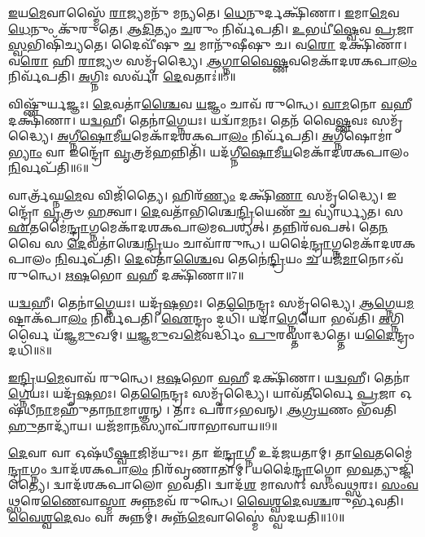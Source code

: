 \-\ul{𑌇}\-𑌯\-\ul{𑌮𑍇}\-𑌵𑌾𑌸𑍍𑌮𑍈᳴ \ul{𑌰𑌾}\-𑌜𑍍𑌯𑌮𑌨𑍁᳴ 𑌮𑌨𑍍𑌯𑌤𑍇।
\-\ul{𑌧𑍇}\-𑌨𑍁𑌰𑍍𑌦𑌕𑍍𑌷𑌿᳴𑌣𑌾।
\-\ul{𑌇}\-𑌮𑌾\-\ul{𑌮𑍇}\-𑌵 \ul{𑌧𑍇}\-𑌨𑍁𑌂 𑌕𑍁᳴𑌰𑍁𑌤𑍇।
\-\ul{𑌆}\-\-\ul{𑌦𑌿}\-𑌤𑍍𑌯𑌂 \ul{𑌚}\-𑌰𑍁𑌂 𑌨𑌿𑌰𑍍𑌵᳴𑌪𑌤𑌿।
\-\ul{𑌉}\-𑌭𑌯𑍀॑\-\ul{𑌷𑍍𑌵𑍇}\-𑌵 \ul{𑌪𑍍𑌰}\-𑌜𑌾\-\ul{𑌸𑍍𑌵}\-𑌭𑌿𑌷𑌿᳴𑌚𑍍𑌯𑌤𑍇।
𑌦𑍈𑌵𑍀᳴𑌷𑍁 \ul{𑌚} 𑌮𑌾𑌨𑍁᳴𑌷𑍀𑌷𑍁 𑌚।
𑌵\-\ul{𑌰𑍋} 𑌦𑌕𑍍𑌷𑌿᳴𑌣𑌾।
𑌵\-\ul{𑌰𑍋} 𑌹𑌿 \ul{𑌰𑌾}\-𑌜𑍍𑌯𑍞 𑌸𑌮𑍃᳴𑌦𑍍𑌧𑍍𑌯𑍈।
\-\ul{𑌆}\-\-\ul{𑌗𑍍𑌨𑌾}\-\-\ul{𑌵𑍈}\-\-\ul{𑌷𑍍𑌣}\-𑌵𑌮𑍇𑌕𑌾᳴\-𑌦𑌶\-𑌕𑌪𑌾\-\ul{𑌲𑌂} 𑌨𑌿𑌰𑍍𑌵᳴𑌪𑌤𑌿।
\-\ul{𑌅}\-𑌗𑍍𑌨𑌿𑌃 𑌸𑌰𑍍𑌵𑌾᳴ \ul{𑌦𑍇}\-𑌵𑌤𑌾𑌃॑॥5॥

𑌵𑌿𑌷𑍍𑌣𑍁᳴𑌰𑍍\mbox{}\-\ul{𑌯}\-𑌜𑍍𑌞𑌃।
\-\ul{𑌦𑍇}\-𑌵𑌤𑌾॑\-\ul{𑌶𑍍𑌚𑍈}\-𑌵 \ul{𑌯}\-𑌜𑍍𑌞𑌂 𑌚𑌾𑌵᳴ 𑌰𑍁𑌨𑍍𑌧𑍇।
\-\ul{𑌵𑌾}\-\-\ul{𑌮}\-𑌨𑍋 \ul{𑌵}\-𑌹𑍀 𑌦𑌕𑍍𑌷𑌿᳴𑌣𑌾।
𑌯\-\ul{𑌦𑍍𑌵}\-𑌹𑍀।
𑌤𑍇𑌨𑌾॑\-\ul{𑌗𑍍𑌨𑍇}\-𑌯𑌃।
𑌯𑌦𑍍𑌵𑌾᳴\-\ul{𑌮}\-𑌨𑌃।
𑌤𑍇𑌨᳴ 𑌵𑍈\-\ul{𑌷𑍍𑌣}\-𑌵𑌃 𑌸𑌮𑍃᳴𑌦𑍍𑌧𑍍𑌯𑍈।
\-\ul{𑌅}\-\-\ul{𑌗𑍍𑌨𑍀}\-\-\ul{𑌷𑍋}\-𑌮𑍀\-\ul{𑌯}\-𑌮𑍇𑌕𑌾᳴\-𑌦𑌶\-𑌕𑌪𑌾\-\ul{𑌲𑌂} 𑌨𑌿𑌰𑍍𑌵᳴𑌪𑌤𑌿।
\-\ul{𑌅}\-𑌗𑍍𑌨𑍀𑌷𑍋𑌮𑌾॑\-\ul{𑌭𑍍𑌯𑌾𑌂} 𑌵𑌾 𑌇𑌨𑍍𑌦𑍍𑌰𑍋᳴ \ul{𑌵𑍃}\-𑌤𑍍𑌰𑌮᳴\-\ul{𑌹}\-𑌨𑍍𑌨𑌿𑌤𑌿᳴।
𑌯𑌦᳴𑌗𑍍𑌨𑍀\-\ul{𑌷𑍋}\-𑌮𑍀\-\ul{𑌯}\-𑌮𑍇𑌕𑌾᳴\-𑌦𑌶\-𑌕𑌪𑌾𑌲𑌂 \ul{𑌨𑌿}\-𑌰𑍍𑌵𑌪᳴𑌤𑌿॥6॥

𑌵𑌾𑌰𑍍𑌤𑍍𑌰᳴𑌘𑍍𑌨\-\ul{𑌮𑍇}\-𑌵 𑌵𑌿𑌜𑌿᳴𑌤𑍍𑌯𑍈।
𑌹𑌿𑌰᳴\-\ul{𑌣𑍍𑌯𑌂} 𑌦𑌕𑍍𑌷𑌿᳴\-\ul{𑌣𑌾} 𑌸𑌮𑍃᳴𑌦𑍍𑌧𑍍𑌯𑍈।
𑌇𑌨𑍍𑌦𑍍𑌰𑍋᳴ \ul{𑌵𑍃}\-𑌤𑍍𑌰𑍞 \ul{𑌹}\-𑌤𑍍𑌵𑌾।
\-\ul{𑌦𑍇}\-𑌵𑌤𑌾᳴𑌭𑌿𑌶𑍍𑌚𑍇\-\ul{𑌨𑍍𑌦𑍍𑌰𑌿}\-𑌯𑍇𑌣᳴ \ul{𑌚} 𑌵𑍍𑌯𑌾॑𑌰𑍍𑌧𑍍𑌯𑌤।
𑌸 \ul{𑌏}\-𑌤𑌮𑍈॑\-\ul{𑌨𑍍𑌦𑍍𑌰𑌾}\-𑌗𑍍𑌨𑌮𑍇𑌕𑌾᳴\-𑌦𑌶\-𑌕𑌪𑌾𑌲𑌮𑌪𑌶𑍍𑌯𑌤𑍍।
𑌤𑌨𑍍𑌨𑌿𑌰᳴𑌵𑌪𑌤𑍍।
𑌤𑍇\-\ul{𑌨} 𑌵𑍈 𑌸 \ul{𑌦𑍇}\-𑌵𑌤𑌾॑𑌶𑍍𑌚𑍇\-\ul{𑌨𑍍𑌦𑍍𑌰𑌿}\-𑌯𑌂 𑌚𑌾𑌵𑌾᳴𑌰𑍁𑌨𑍍𑌧।
𑌯𑌦𑍈॑\-\ul{𑌨𑍍𑌦𑍍𑌰𑌾}\-𑌗𑍍𑌨𑌮𑍇𑌕𑌾᳴\-𑌦𑌶\-𑌕𑌪𑌾𑌲𑌂 \ul{𑌨𑌿}\-𑌰𑍍𑌵𑌪᳴𑌤𑌿।
\-\ul{𑌦𑍇}\-𑌵𑌤𑌾॑\-\ul{𑌶𑍍𑌚𑍈}\-𑌵 𑌤𑍇𑌨𑍇॑\-\ul{𑌨𑍍𑌦𑍍𑌰𑌿}\-𑌯𑌂 \ul{𑌚} 𑌯𑌜᳴\-\ul{𑌮𑌾}\-𑌨𑍋\-𑌽𑌵᳴ 𑌰𑍁𑌨𑍍𑌧𑍇।
\-\ul{𑌋}\-\-\ul{𑌷}\-𑌭𑍋 \ul{𑌵}\-𑌹𑍀 𑌦𑌕𑍍𑌷𑌿᳴𑌣𑌾॥7॥

𑌯\-\ul{𑌦𑍍𑌵}\-𑌹𑍀।
𑌤𑍇𑌨𑌾॑\-\ul{𑌗𑍍𑌨𑍇}\-𑌯𑌃।
𑌯𑌦𑍃᳴\-\ul{𑌷}\-𑌭𑌃।
𑌤𑍇\-\ul{𑌨𑍈}\-𑌨𑍍𑌦𑍍𑌰𑌃 𑌸𑌮𑍃᳴𑌦𑍍𑌧𑍍𑌯𑍈।
\-\ul{𑌆}\-\-\ul{𑌗𑍍𑌨𑍇}\-𑌯\-\ul{𑌮}\-𑌷𑍍𑌟𑌾\-𑌕᳴𑌪𑌾\-\ul{𑌲𑌂} 𑌨𑌿𑌰𑍍𑌵᳴𑌪𑌤𑌿।
\-\ul{𑌐}\-𑌨𑍍𑌦𑍍𑌰𑌂 𑌦𑌧𑌿᳴।
𑌯𑌦𑌾॑\-\ul{𑌗𑍍𑌨𑍇}\-𑌯𑍋 𑌭𑌵᳴𑌤𑌿।
\-\ul{𑌅}\-𑌗𑍍𑌨𑌿𑌰𑍍𑌵𑍈 𑌯᳴𑌜𑍍𑌞\-\ul{𑌮𑍁}\-𑌖𑌮𑍍।
\-\ul{𑌯}\-\-\ul{𑌜𑍍𑌞}\-\-\ul{𑌮𑍁}\-𑌖\-\ul{𑌮𑍇}\-𑌵𑌰𑍍𑌦𑍍𑌧𑌿𑌂᳴ \ul{𑌪𑍁}\-𑌰𑌸𑍍𑌤𑌾॑𑌦𑍍𑌧𑌤𑍍𑌤𑍇।
𑌯\-\ul{𑌦𑍈}\-𑌨𑍍𑌦𑍍𑌰𑌂 𑌦𑌧𑌿᳴॥8॥

\-\ul{𑌇}\-\-\ul{𑌨𑍍𑌦𑍍𑌰𑌿}\-𑌯\-\ul{𑌮𑍇}\-𑌵𑌾𑌵᳴ 𑌰𑍁𑌨𑍍𑌧𑍇।
\-\ul{𑌋}\-\-\ul{𑌷}\-𑌭𑍋 \ul{𑌵}\-𑌹𑍀 𑌦𑌕𑍍𑌷𑌿᳴𑌣𑌾।
𑌯\-\ul{𑌦𑍍𑌵}\-𑌹𑍀।
𑌤𑍇𑌨𑌾॑\-\ul{𑌗𑍍𑌨𑍇}\-𑌯𑌃।
𑌯𑌦𑍃᳴\-\ul{𑌷}\-𑌭𑌃।
𑌤𑍇\-\ul{𑌨𑍈}\-𑌨𑍍𑌦𑍍𑌰𑌃 𑌸𑌮𑍃᳴𑌦𑍍𑌧𑍍𑌯𑍈।
𑌯𑌾𑌵᳴\-\ul{𑌤𑍀}\-𑌰𑍍𑌵𑍈 \ul{𑌪𑍍𑌰}\-𑌜𑌾 𑌓𑌷᳴𑌧𑍀\-\ul{𑌨𑌾}\-𑌮𑌹𑍁᳴𑌤𑌾\-\ul{𑌨𑌾}\-𑌮𑌾𑌶𑍍𑌞𑌨𑍍।
𑌤𑌾𑌃 𑌪𑌰𑌾᳴\-𑌽𑌭𑌵𑌨𑍍।
\-\ul{𑌆}\-\-\ul{𑌗𑍍𑌰}\-\-\ul{𑌯}\-𑌣𑌂 𑌭᳴𑌵𑌤𑌿 \ul{𑌹𑍁}\-𑌤𑌾𑌦𑍍𑌯𑌾᳴𑌯।
𑌯𑌜᳴𑌮𑌾\-\ul{𑌨}\-𑌸𑍍𑌯𑌾𑌪᳴𑌰𑌾\-𑌭𑌾𑌵𑌾𑌯॥9॥

\-\ul{𑌦𑍇}\-𑌵𑌾 𑌵𑌾 𑌓𑌷᳴𑌧𑍀\-\ul{𑌷𑍍𑌵𑌾}\-𑌜𑌿𑌮᳴𑌯𑍁𑌃।
𑌤𑌾 𑌇᳴\-\ul{𑌨𑍍𑌦𑍍𑌰𑌾}\-𑌗𑍍𑌨𑍀 𑌉𑌦᳴𑌜𑌯𑌤𑌾𑌮𑍍।
𑌤𑌾\-\ul{𑌵𑍇}\-𑌤𑌮𑍈॑\-\ul{𑌨𑍍𑌦𑍍𑌰𑌾}\-𑌗𑍍𑌨𑌂 𑌦𑍍𑌵𑌾𑌦᳴𑌶𑌕𑌪𑌾\-\ul{𑌲𑌂} 𑌨𑌿𑌰᳴𑌵𑍃𑌣𑌾𑌤𑌾𑌮𑍍।
𑌯𑌦𑍈॑\-\ul{𑌨𑍍𑌦𑍍𑌰𑌾}\-𑌗𑍍𑌨𑍋 𑌭\-\ul{𑌵}\-𑌤𑍍𑌯𑍁𑌜𑍍𑌜𑌿᳴𑌤𑍍𑌯𑍈।
𑌦𑍍𑌵𑌾𑌦᳴𑌶𑌕𑌪𑌾𑌲𑍋 𑌭𑌵𑌤𑌿।
𑌦𑍍𑌵𑌾𑌦᳴\-\ul{𑌶} 𑌮𑌾𑌸𑌾𑌃॑ 𑌸𑌂𑌵\-\ul{𑌥𑍍𑌸}\-𑌰𑌃।
\-\ul{𑌸𑌂}\-\-\ul{𑌵}\-\-\ul{𑌥𑍍𑌸}\-𑌰𑍇\-\ul{𑌣𑍈}\-𑌵𑌾\-\ul{𑌸𑍍𑌮𑌾} 𑌅\-\ul{𑌨𑍍𑌨}\-𑌮𑌵᳴ 𑌰𑍁𑌨𑍍𑌧𑍇।
\-\ul{𑌵𑍈}\-\-\ul{𑌶𑍍𑌵}\-\-\ul{𑌦𑍇}\-𑌵\-\-\ul{𑌶𑍍𑌚}\-𑌰𑍁𑌰𑍍𑌭᳴𑌵𑌤𑌿।
\-\ul{𑌵𑍈}\-\-\ul{𑌶𑍍𑌵}\-\-\ul{𑌦𑍇}\-𑌵𑌂 𑌵𑌾 𑌅𑌨𑍍𑌨𑌮𑍍॑।
𑌅𑌨𑍍𑌨᳴\-\ul{𑌮𑍇}\-𑌵𑌾𑌸𑍍𑌮𑍈॑ 𑌸𑍍𑌵𑌦𑌯𑌤𑌿॥10॥

